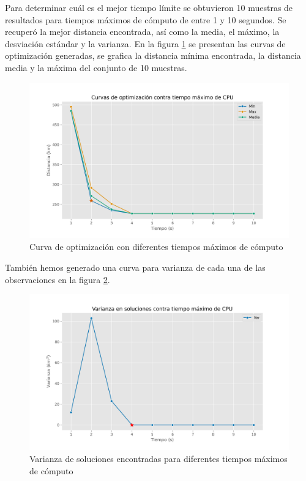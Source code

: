 \documentclass[journal]{IEEEtran}
\begin{document}
            Para determinar cuál es el mejor tiempo límite se obtuvieron 10 muestras de resultados para tiempos máximos de cómputo de entre 1 y 10 segundos. Se recuperó la mejor distancia encontrada, así como la media, el máximo, la desviación estándar y la varianza. En la figura \ref{fig:optim-curves} se presentan las curvas de optimización generadas, se grafica la distancia mínima encontrada, la distancia media y la máxima del conjunto de 10 muestras.
            \begin{figure}[h!]
                \centering
                \includegraphics[scale=0.35]{../img/curvas-opt.png}
                \caption{Curva de optimización con diferentes tiempos máximos de cómputo}
                \label{fig:optim-curves}
            \end{figure}

            También hemos generado una curva para varianza de cada una de las observaciones en la figura \ref{fig:optim-var}.

            \begin{figure}[h!]
                \centering
                \includegraphics[scale=0.35]{../img/varianza-opt.png}
                \caption{Varianza de soluciones encontradas para diferentes tiempos máximos de cómputo}
                \label{fig:optim-var}
            \end{figure}
\end{document}
